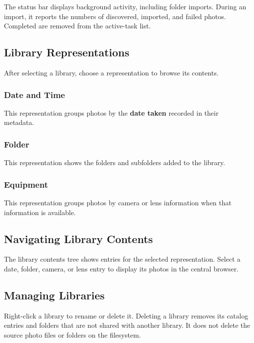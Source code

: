 \documentclass[11pt]{article}
\begin{document}
The status bar displays background activity, including folder imports.
During an import, it reports the numbers of discovered, imported, and failed
photos. Completed are removed from the active-task list.

\subsection{Library Representations}

After selecting a library, choose a representation to browse its contents.

\subsubsection{Date and Time}

This representation groups photos by the \textbf{date taken} recorded in their metadata.

\subsubsection{Folder}

This representation shows the folders and subfolders added to the library.

\subsubsection{Equipment}

This representation groups photos by camera or lens information when that
information is available.

\subsection{Navigating Library Contents}

The library contents tree shows entries for the selected representation.
Select a date, folder, camera, or lens entry to display its photos in the
central browser.

\subsection{Managing Libraries}

Right-click a library to rename or delete it. Deleting a library removes its
catalog entries and folders that are not shared with another library.
It does not delete the source photo files or folders on the filesystem.
\end{document}
